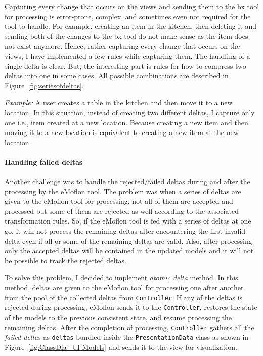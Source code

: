 Capturing every change that occurs on the views and sending them to the bx tool for processing is error-prone, complex, and sometimes even not required for the tool to handle. For example, creating an item in the kitchen, then deleting it and sending both of the changes to the bx tool do not make sense as the item does not exist anymore. Hence, rather capturing every change that occurs on the views, I have implemented a few rules while capturing them. The handling of a single delta is clear. But, the interesting part is rules for how to compress two deltas into one in some cases. All possible combinations are described in Figure~\ref{fig:seriesofdeltas}.

\textit{Example:} A user creates a table in the kitchen and then move it to a new location. In this situation, instead of creating two different deltas, I capture only one i.e., item created at a new location. Because creating a new item and then moving it to a new location is equivalent to creating a new item at the new location.

\paragraph{Handling failed deltas}
Another challenge was to handle the rejected/failed deltas during and after the processing by the eMoflon tool. The problem was when a series of deltas are given to the eMoflon tool for processing, not all of them are accepted and processed but some of them are rejected as well according to the associated transformation rules. So, if the eMoflon tool is fed with a series of deltas at one go, it will not process the remaining deltas after encountering the first invalid delta even if all or some of the remaining deltas are valid. Also, after processing only the accepted deltas will be contained in the updated models and it will not be possible to track the rejected deltas. 

To solve this problem, I decided to implement \textit{atomic delta} method. In this method, deltas are given to the eMoflon tool for processing one after another from the pool of the collected deltas from \texttt{Controller}. If any of the deltas is rejected during processing, eMoflon sends it to the \texttt{Controller}, restores the state of the models to the previous consistent state, and resume processing the remaining deltas. After the completion of processing, \texttt{Controller} gathers all the \textit{failed delta}s as \texttt{deltas} bundled inside the \texttt{PresentationData} class as shown in Figure~\ref{fig:ClassDia_UI-Models} and sends it to the view for visualization. 

